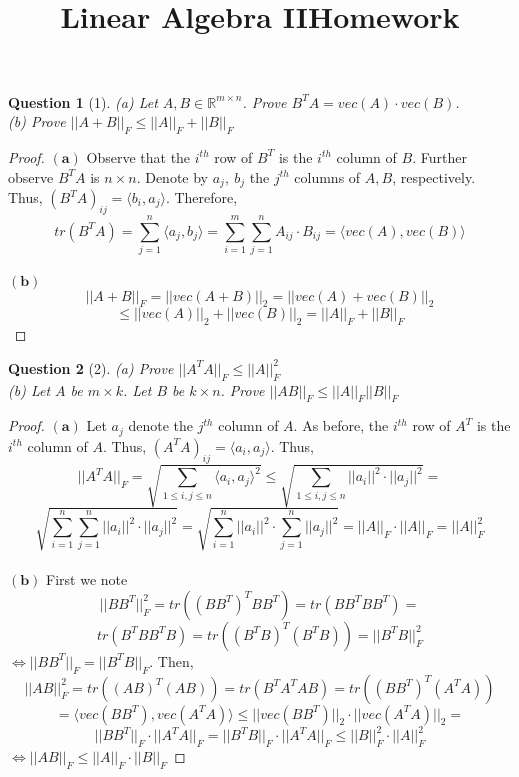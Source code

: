 \documentclass[11pt]{article}
\title{\vspace{-50pt}
\Huge \name
\\\vspace{20pt}
\huge Linear Algebra II\hfill Homework \hw}
\author{}
\date{}
\theoremstyle{quest}
\newtheorem*{question}{Question}
\begin{document}
\maketitle

\begin{question}[1]
(a) Let $A, B \in \mathbb{R}^{m \times n}$. Prove $B^TA = vec(A) \cdot vec(B)$.
\\(b) Prove $||A + B||_F \le ||A||_F + ||B||_F$
\end{question}
\begin{proof}
$\mathbf{(a)}$ Observe that the $i^{th}$ row of $B^T$ is the $i^{th}$ column of $B$. Further observe $B^TA$ is $n \times n$. Denote by $a_j,\ b_j$ the $j^{th}$ columns of $A, B$, respectively.
\\Thus, $(B^TA)_{i j} = \langle b_i, a_j \rangle$. Therefore,
$$tr(B^TA) = \sum_{j=1}^n \langle a_j, b_j \rangle = \sum_{i=1}^m \sum_{j=1}^n A_{i j} \cdot B_{i j} = \langle vec(A), vec(B)\rangle$$
\\$\mathbf{(b)}$
$$||A+B||_F = ||vec(A+B)||_2 = ||vec(A) + vec(B)||_2$$ $$\le ||vec(A)||_2 + ||vec(B)||_2 = ||A||_F + ||B||_F$$
\end{proof}
\begin{question}[2]
(a) Prove $||A^TA||_F \le ||A||_F^2$
\\(b) Let $A$ be $m \times k$. Let $B$ be $k \times n$. Prove $||AB||_F \le ||A||_F||B||_F$
\end{question}
\begin{proof}
$\mathbf{(a)}$ Let $a_j$ denote the $j^{th}$ column of $A$. As before, the $i^{th}$ row of $A^T$ is the $i^{th}$ column of $A$. Thus, $(A^TA)_{i j} = \langle a_i, a_j \rangle$. Thus,
$$||A^TA||_F = \sqrt{\sum_{1 \le i,j \le n} \langle a_i, a_j \rangle^2} \le \sqrt{\sum_{1 \le i,j \le n} ||a_i||^2 \cdot ||a_j||^2} = $$ $$\sqrt{\sum_{i=1}^n \sum_{j=1}^n ||a_i||^2 \cdot ||a_j||^2} = \sqrt{\sum_{i=1}^n ||a_i||^2 \cdot \sum_{j=1}^n  ||a_j||^2} = ||A||_F \cdot ||A||_F = ||A||_F^2$$
\\$\mathbf{(b)}$ First we note
$$||BB^T||_F^2 = tr((BB^T)^TBB^T) = tr(BB^TBB^T) =$$
$$tr(B^TBB^TB) = tr((B^TB)^T(B^TB)) = ||B^TB||_F^2$$
$\iff ||BB^T||_F = ||B^TB||_F$. Then,
$$||AB||_F^2 = tr((AB)^T(AB)) = tr(B^T A^T A B) = tr((BB^T)^T(A^TA))$$
$$= \langle vec(BB^T), vec(A^TA) \rangle \le ||vec(BB^T)||_2 \cdot ||vec(A^TA)||_2 = $$
$$||BB^T||_F \cdot ||A^TA||_F = ||B^TB||_F \cdot ||A^TA||_F \le ||B||_F^2 \cdot ||A||_F^2$$
$\iff ||AB||_F \le ||A||_F \cdot ||B||_F$
\end{proof}
\end{document}
